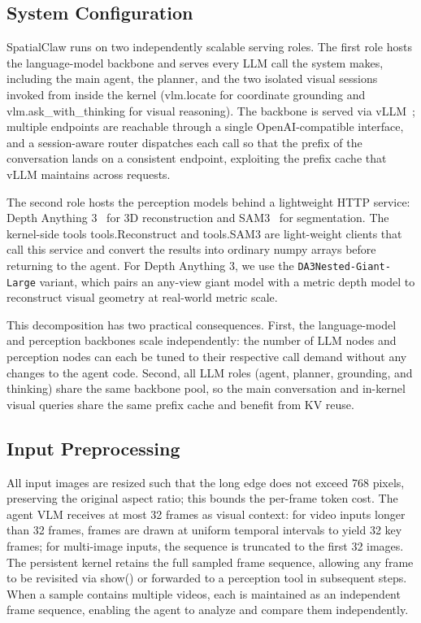 \documentclass{llmxive}
\providecommand{\ours}{SpatialClaw}
\providecommand{\apicode}[1]{#1}
\begin{document}
\subsection{System Configuration}
\label{app:topology}
\ours{} runs on two independently scalable serving roles. The first role hosts the language-model backbone and serves every LLM call the system makes, including the main agent, the planner, and the two isolated visual sessions invoked from inside the kernel (\apicode{vlm.locate} for coordinate grounding and \apicode{vlm.ask_with_thinking} for visual reasoning). The backbone is served via vLLM~\citep{kwon2023efficient}; multiple endpoints are reachable through a single OpenAI-compatible interface, and a session-aware router dispatches each call so that the prefix of the conversation lands on a consistent endpoint, exploiting the prefix cache that vLLM maintains across requests.

The second role hosts the perception models behind a lightweight HTTP service: Depth Anything 3~\citep{depthanything3} for 3D reconstruction and SAM3~\citep{carion2025sam} for segmentation. The kernel-side tools \apicode{tools.Reconstruct} and \apicode{tools.SAM3} are light-weight clients that call this service and convert the results into ordinary numpy arrays before returning to the agent.
For Depth Anything 3, we use the \texttt{DA3Nested-Giant-Large} variant, which pairs an any-view giant model with a metric depth model to reconstruct visual geometry at real-world metric scale.

This decomposition has two practical consequences. First, the language-model and perception backbones scale independently: the number of LLM nodes and perception nodes can each be tuned to their respective call demand without any changes to the agent code. Second, all LLM roles (agent, planner, grounding, and thinking) share the same backbone pool, so the main conversation and in-kernel visual queries share the same prefix cache and benefit from KV reuse.

\subsection{Input Preprocessing}
\label{app:input_preprocess}
All input images are resized such that the long edge does not exceed 768 pixels, preserving the original aspect ratio; this bounds the per-frame token cost. The agent VLM receives at most 32 frames as visual context: for video inputs longer than 32 frames, frames are drawn at uniform temporal intervals to yield 32 key frames; for multi-image inputs, the sequence is truncated to the first 32 images. The persistent kernel retains the full sampled frame sequence, allowing any frame to be revisited via \apicode{show()} or forwarded to a perception tool in subsequent steps. When a sample contains multiple videos, each is maintained as an independent frame sequence, enabling the agent to analyze and compare them independently.
\end{document}
